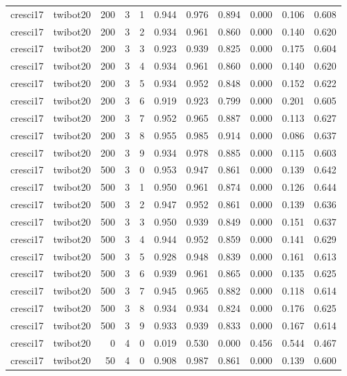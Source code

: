 \begin{tabular}{llrrrrrrrrr}
cresci17 & twibot20 & 200 & 3 & 1 & 0.944 & 0.976 & 0.894 & 0.000 & 0.106 & 0.608 \\
cresci17 & twibot20 & 200 & 3 & 2 & 0.934 & 0.961 & 0.860 & 0.000 & 0.140 & 0.620 \\
cresci17 & twibot20 & 200 & 3 & 3 & 0.923 & 0.939 & 0.825 & 0.000 & 0.175 & 0.604 \\
cresci17 & twibot20 & 200 & 3 & 4 & 0.934 & 0.961 & 0.860 & 0.000 & 0.140 & 0.620 \\
cresci17 & twibot20 & 200 & 3 & 5 & 0.934 & 0.952 & 0.848 & 0.000 & 0.152 & 0.622 \\
cresci17 & twibot20 & 200 & 3 & 6 & 0.919 & 0.923 & 0.799 & 0.000 & 0.201 & 0.605 \\
cresci17 & twibot20 & 200 & 3 & 7 & 0.952 & 0.965 & 0.887 & 0.000 & 0.113 & 0.627 \\
cresci17 & twibot20 & 200 & 3 & 8 & 0.955 & 0.985 & 0.914 & 0.000 & 0.086 & 0.637 \\
cresci17 & twibot20 & 200 & 3 & 9 & 0.934 & 0.978 & 0.885 & 0.000 & 0.115 & 0.603 \\
cresci17 & twibot20 & 500 & 3 & 0 & 0.953 & 0.947 & 0.861 & 0.000 & 0.139 & 0.642 \\
cresci17 & twibot20 & 500 & 3 & 1 & 0.950 & 0.961 & 0.874 & 0.000 & 0.126 & 0.644 \\
cresci17 & twibot20 & 500 & 3 & 2 & 0.947 & 0.952 & 0.861 & 0.000 & 0.139 & 0.636 \\
cresci17 & twibot20 & 500 & 3 & 3 & 0.950 & 0.939 & 0.849 & 0.000 & 0.151 & 0.637 \\
cresci17 & twibot20 & 500 & 3 & 4 & 0.944 & 0.952 & 0.859 & 0.000 & 0.141 & 0.629 \\
cresci17 & twibot20 & 500 & 3 & 5 & 0.928 & 0.948 & 0.839 & 0.000 & 0.161 & 0.613 \\
cresci17 & twibot20 & 500 & 3 & 6 & 0.939 & 0.961 & 0.865 & 0.000 & 0.135 & 0.625 \\
cresci17 & twibot20 & 500 & 3 & 7 & 0.945 & 0.965 & 0.882 & 0.000 & 0.118 & 0.614 \\
cresci17 & twibot20 & 500 & 3 & 8 & 0.934 & 0.934 & 0.824 & 0.000 & 0.176 & 0.625 \\
cresci17 & twibot20 & 500 & 3 & 9 & 0.933 & 0.939 & 0.833 & 0.000 & 0.167 & 0.614 \\
cresci17 & twibot20 & 0 & 4 & 0 & 0.019 & 0.530 & 0.000 & 0.456 & 0.544 & 0.467 \\
cresci17 & twibot20 & 50 & 4 & 0 & 0.908 & 0.987 & 0.861 & 0.000 & 0.139 & 0.600 \\

\end{tabular}
